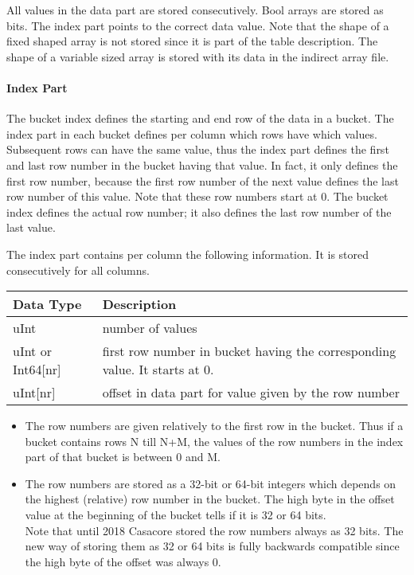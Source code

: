 All values in the data part are stored consecutively. Bool arrays are
stored as bits. The index part points to the correct data value.
Note that the shape of a fixed shaped array is not
stored since it is part of the table description. The shape of a variable
sized array is stored with its data in the indirect array file.

\paragraph{Index Part\\}
The bucket index defines the starting and end row of the data in a
bucket. The index part in each bucket defines per column which rows
have which values. Subsequent rows can have the same value, thus the
index part defines the first and last row number in the bucket having
that value. In fact, it only defines the first row number, because the
first row number of the next value defines the last row number of this
value. Note that these row numbers start at 0. The bucket index
defines the actual row number; it also defines the last row number of
the last value.

The index part contains per column the following information. It is
stored consecutively for all columns.

\vspace{0.15in}
\begin{tabular}{|l|p{13cm}|} \hline
  Data Type & Description \\ \hline\hline
  uInt & number of values \\
  uInt or Int64[nr] & first row number in bucket having the
                      corresponding value. It starts at 0. \\
  uInt[nr] & offset in data part for value given by the row number \\
  \hline
\end{tabular}
\vspace{0.15in}

\begin{itemize}
\item
The row numbers are given relatively to the first row in the bucket.
Thus if a bucket contains rows N till N+M, the values of the row numbers
in the index part of that bucket is between 0 and M.
\item
The row numbers are stored as a 32-bit or 64-bit integers which depends
on the highest (relative) row number in the bucket. The high byte in
the offset value at the beginning of the bucket tells if it is 32 or 64 bits.
\\Note that until 2018 Casacore stored the row numbers always as 32 bits.
The new way of storing them as 32 or 64 bits is fully backwards
compatible since the high byte of the offset was always 0.
\end{itemize}

